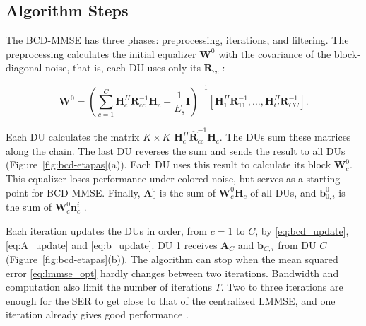 
\subsection{Algorithm Steps}\label{subsubsec:bcd-etapas}
The BCD-MMSE has three phases: preprocessing, iterations, and filtering. The preprocessing calculates the initial equalizer $\mathbf W^0$ with the covariance of the block-diagonal noise, that is, each DU uses only its $\mathbf R_{cc}$ \cite{zhao2021-globecom,zhao2025jsac}:

\begin{equation}\label{eq:bdac}
\mathbf W^0 = \left(\sum_{c=1}^{C}\mathbf H_c^H\mathbf R_{cc}^{-1}\mathbf H_c + \frac{1}{E_s}\mathbf I\right)^{-1}\left[\mathbf H_1^H\mathbf R_{11}^{-1}, \ldots, \mathbf H_C^H\mathbf R_{CC}^{-1}\right].
\end{equation}

Each DU calculates the matrix $K \times K$ $\mathbf H_c^H\hat{\mathbf R}_{cc}^{-1}\mathbf H_c$. The DUs sum these matrices along the chain. The last DU reverses the sum and sends the result to all DUs (Figure~\ref{fig:bcd-etapas}(a)). Each DU uses this result to calculate its block $\mathbf W_c^0$. This equalizer loses performance under colored noise, but serves as a starting point for BCD-MMSE. Finally, $\mathbf A_0^0$ is the sum of $\mathbf W_c^0\mathbf H_c$ of all DUs, and $\mathbf b_{0,i}^0$ is the sum of $\mathbf W_c^0\mathbf n_c^i$ \cite{zhao2025jsac}.

Each iteration updates the DUs in order, from $c = 1$ to $C$, by \eqref{eq:bcd_update}, \eqref{eq:A_update} and \eqref{eq:b_update}. DU 1 receives $\mathbf A_C$ and $\mathbf b_{C,i}$ from DU $C$ (Figure~\ref{fig:bcd-etapas}(b)). The algorithm can stop when the mean squared error \eqref{eq:lmmse_opt} hardly changes between two iterations. Bandwidth and computation also limit the number of iterations $T$. Two to three iterations are enough for the SER to get close to that of the centralized LMMSE, and one iteration already gives good performance \cite{zhao2025jsac}.


